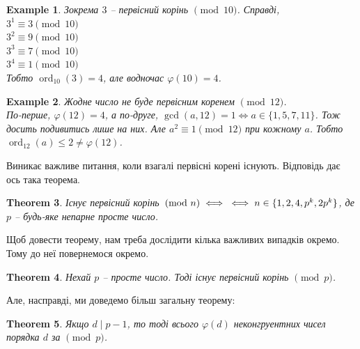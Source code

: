 \documentclass[a4paper, 10pt]{article}
\theoremstyle{theoremdd}
\newtheorem{theorem}{Theorem}[subsection]
\theoremstyle{theoremdd}
\theoremstyle{theoremdd}
\theoremstyle{theoremdd}
\newtheorem{example}[theorem]{Example}
\theoremstyle{theoremdd}
\theoremstyle{theoremdd}
\theoremstyle{theoremdd}
\theoremstyle{theoremdd}
\DeclareMathOperator{\ord}{ord}
\begin{document}
\begin{example}
Зокрема $3$ -- первісний корінь $\!\! \pmod {10}$. Справді,\\
$3^1 \equiv 3 \pmod {10}$\\
$3^2 \equiv 9 \pmod {10}$\\
$3^3 \equiv 7 \pmod {10}$\\
$3^4 \equiv 1 \pmod {10}$\\
Тобто $\ord_{10}(3) = 4$, але водночас $\varphi(10) = 4$.
\end{example}

\begin{example}
Жодне число не буде первісним коренем $\!\! \pmod {12}$.\\
По-перше, $\varphi(12) = 4$, а по-друге, $\gcd(a,12) = 1 \iff a \in \{1,5,7,11\}$. Тож досить подивитись лише на них. Але $a^2 \equiv 1 \pmod {12}$ при кожному $a$. Тобто $\ord_{12}(a) \leq 2 \neq \varphi(12)$.
\end{example}

Виникає важливе питання, коли взагалі первісні корені існують. Відповідь дає ось така теорема.

\begin{theorem}
\label{primitive_root_exists}
Існує первісний корінь $\!\! \pmod n \iff \\ \iff n \in \{1,2,4,p^k,2p^k\}$, де $p$ -- будь-яке непарне просте число.
\end{theorem}

Щоб довести теорему, нам треба дослідити кілька важливих випадків окремо. Тому до неї повернемося окремо.

\begin{theorem}
\label{primitive root (mod p)}
Нехай $p$ -- просте число. Тоді існує первісний корінь $\pmod p$.
\end{theorem}

Але, насправді, ми доведемо більш загальну теорему:
\begin{theorem}
Якщо $d \mid p-1$, то тоді всього $\varphi(d)$ неконгруентних чисел порядка $d$ за $\!\! \pmod p$.
\end{theorem}
\end{document}
